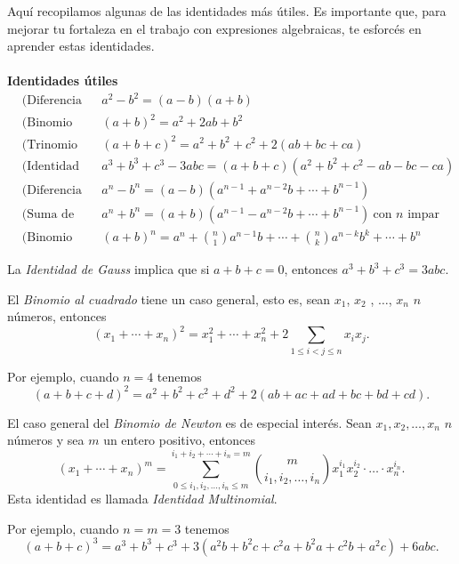 Aquí recopilamos algunas de las identidades más útiles.
Es importante que, para mejorar tu fortaleza en el trabajo con expresiones algebraicas, te esforcés en aprender estas identidades.\\
\vspace{3mm}\\
\textbf{Identidades útiles}\\
\vspace{-5mm}
\begin{align*}
    &\text{(Diferencia de cuadrados)} && a^2 - b^2 = (a - b)(a + b)\\[2mm]
    &\text{(Binomio al cuadrado)}     && (a + b)^2 = a^2 + 2ab + b^2\\[2mm]
    &\text{(Trinomio al cuadrado)}    && (a + b + c)^2 = a^2 + b^2 + c^2 + 2(ab + bc + ca)\\[2mm]
    &\text{(Identidad de Gauss)}      && a^3 + b^3 + c^3 - 3abc = (a + b + c)(a^2 + b^2 + c^2 - ab - bc - ca)\\[2mm]
    &\text{(Diferencia de potencias)} && a^n - b^n = (a - b)(a^{n - 1} + a^{n - 2}b + \cdots + b^{n - 1})\\[2mm]
    &\text{(Suma de potencias)}       && a^n + b^n = (a + b)(a^{n - 1} - a^{n - 2}b + \cdots + b^{n - 1}) \ \text{con $n$ impar}\\[1.5mm]
    &\text{(Binomio de Newton)}       && (a + b)^n = a^n + \binom{n}{1} a^{n - 1}b + \cdots + \binom{n}{k} a^{n -k}b^k + \cdots + b^n
\end{align*}

\begin{remark}
    La \textit{Identidad de Gauss} implica que si $a + b + c = 0$, entonces $a^3 + b^3 + c^3 = 3abc$.
\end{remark}

\begin{remark}
    El \textit{Binomio al cuadrado} tiene un caso general, esto es, sean $x_1$, $x_2$ , $\ldots$, $x_n$ $n$ números, entonces
    \[
        (x_1 + \cdots + x_n)^2 = x_1^2 + \cdots + x_n^2 + 2 \sum_{1 \leq i < j \leq n} x_i x_j.
    \]
\end{remark}

Por ejemplo, cuando $n = 4$ tenemos
\[
    (a + b + c + d)^2 = a^2 + b^2 + c^2 + d^2 + 2 (ab + ac + ad + bc + bd + cd).
\]

\begin{remark}
    El caso general del \textit{Binomio de Newton} es de especial interés.
    Sean $x_1, x_2,\ldots, x_n$ $n$ números y sea $m$ un entero positivo, entonces
    \[
        (x_1 + \cdots + x_n)^m = \sum_{0 \leq i_1, i_2, \ldots, i_n \leq m}^{ i_1 + i_2 + \cdots + i_n = m } \binom{m}{i_1, i_2, \ldots, i_n} x_1^{i_1} x_2^{i_2} \cdot \ldots \cdot x_n^{i_n}.
    \]
    Esta identidad es llamada \textit{Identidad Multinomial}.
\end{remark}
Por ejemplo, cuando $n = m = 3$ tenemos
\[
    (a + b + c)^3 = a^3 + b^3 + c^3 + 3(a^2 b + b^2 c + c^2 a + b^2 a + c^2 b + a^2 c) + 6abc.
\]


